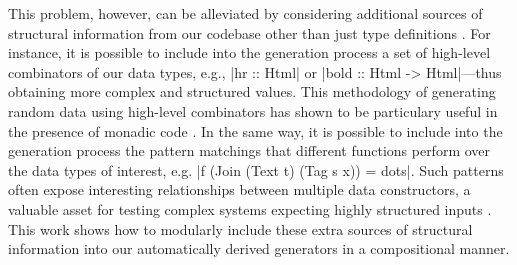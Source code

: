This problem, however, can be alleviated by considering additional sources of
structural information from our codebase other than just type definitions
\cite{Mista2019GeneratingRS}.
%
%
For instance, it is possible to include into the generation process a set of
high-level combinators of our data types, e.g., |hr :: Html| or |bold :: Html ->
Html|---thus obtaining more complex and structured values.
%
This methodology of generating random data using high-level combinators has
shown to be particulary useful in the presence of monadic code
\cite{Claessen:2002, grieco2017}.
%
%
In the same way, it is possible to include into the generation process the
pattern matchings that different functions perform over the data types of
interest, e.g. |f (Join (Text t) (Tag s x)) = dots|.
%
Such patterns often expose interesting relationships between multiple data
constructors, a valuable asset for testing complex systems expecting highly
structured inputs \cite{klein2009randomized}.
%
%
This work shows how to modularly include these extra sources of structural
information into our automatically derived generators in a compositional manner.

